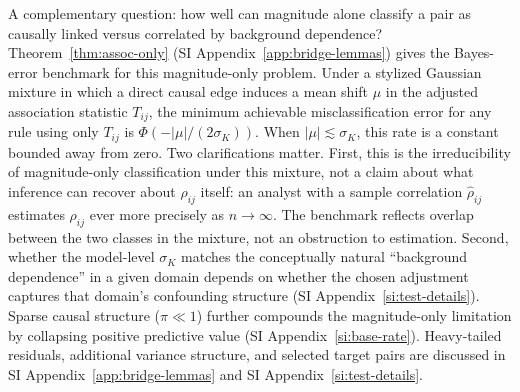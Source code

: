 A complementary question: how well can magnitude alone classify a pair as causally linked versus correlated by background dependence? Theorem~\ref{thm:assoc-only} (SI Appendix~\ref{app:bridge-lemmas}) gives the Bayes-error benchmark for this magnitude-only problem. Under a stylized Gaussian mixture in which a direct causal edge induces a mean shift $\mu$ in the adjusted association statistic $T_{ij}$, the minimum achievable misclassification error for any rule using only $T_{ij}$ is $\Phi(-|\mu|/(2\sigma_K))$. When $|\mu|\lesssim \sigma_K$, this rate is a constant bounded away from zero. Two clarifications matter. First, this is the irreducibility of magnitude-only classification under this mixture, not a claim about what inference can recover about $\rho_{ij}$ itself: an analyst with a sample correlation $\hat\rho_{ij}$ estimates $\rho_{ij}$ ever more precisely as $n\to\infty$. The benchmark reflects overlap between the two classes in the mixture, not an obstruction to estimation. Second, whether the model-level $\sigma_K$ matches the conceptually natural ``background dependence'' in a given domain depends on whether the chosen adjustment captures that domain's confounding structure (SI Appendix~\ref{si:test-details}). Sparse causal structure ($\pi \ll 1$) further compounds the magnitude-only limitation by collapsing positive predictive value (SI Appendix~\ref{si:base-rate}). Heavy-tailed residuals, additional variance structure, and selected target pairs are discussed in SI Appendix~\ref{app:bridge-lemmas} and SI Appendix~\ref{si:test-details}.
